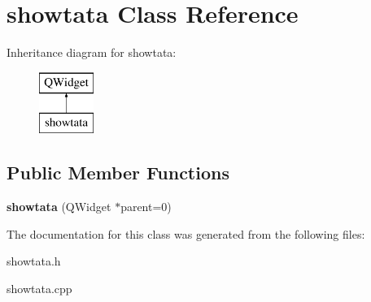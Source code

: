 \hypertarget{classshowtata}{}\section{showtata Class Reference}
\label{classshowtata}
Inheritance diagram for showtata\+:\begin{figure}[H]
\begin{center}
\leavevmode
\includegraphics[height=2.000000cm]{classshowtata}
\end{center}
\end{figure}
\subsection*{Public Member Functions}
\begin{DoxyCompactItemize}
\item 
\hypertarget{classshowtata_a8b9382b64c639b083122cf4a5cee975d}{}\label{classshowtata_a8b9382b64c639b083122cf4a5cee975d} 
{\bfseries showtata} (Q\+Widget $\ast$parent=0)
\end{DoxyCompactItemize}


The documentation for this class was generated from the following files\+:\begin{DoxyCompactItemize}
\item 
showtata.\+h\item 
showtata.\+cpp\end{DoxyCompactItemize}
